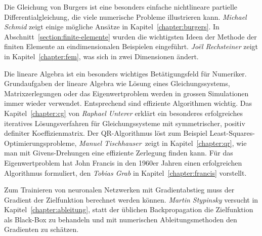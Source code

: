 Die Gleichung von Burgers ist eine besonders einfache nichtlineare
partielle Differentialgleichung, die viele numerische Probleme
illustrieren kann.
%
%
{\em Michael Schmid} zeigt einige mögliche Ansätze in
Kapitel~\ref{chapter:burgers}.
%
In Abschnitt~\ref{section:finite-elemente} wurden die wichtigsten Ideen
der Methode der finiten Elemente an eindimensionalen Beispielen eingeführt.
{\em Joël Rechsteiner} zeigt in Kapitel~\ref{chapter:fem}, was sich in
zwei Dimensionen ändert.
%
%

Die lineare Algebra ist ein besonders wichtiges Betätigungsfeld für
Numeriker.
Grundaufgaben der lineare Algebra wie Lösung eines Gleichungssystems,
Matrixzerlegungen oder das Eigenwertproblem werden in grossen
Simulationen immer wieder verwendet.
%
%
Entsprechend sind effiziente Algorithmen wichtig.
Das Kapitel~\ref{chapter:cg} von {\em Raphael Unterer} erklärt
ein besonderes erfolgreiches iteratives
Lösungsverfahren für Gleichungssysteme mit symmetrischer, positiv
definiter Koeffizienmatrix.
Der QR-Algorithmus löst zum Beispiel Least-Squares-Optimierungsprobleme,
%
{\em Manuel Tischhauser} zeigt in Kapitel~\ref{chapter:qr}, wie man mit
Givens-Drehungen eine effiziente Zerlegung finden kann.
%
%
Für das Eigenwertproblem hat John Francis in den 1960er Jahren einen
erfolgreichen Algorithmus formuliert, den {\em Tobias Grab} in
Kapitel~\ref{chapter:francis} vorstellt.
%
%

Zum Trainieren von neuronalen Netzwerken mit Gradientabstieg muss 
der Gradient der Zielfunktion berechnet werden können.
{\em Martin Stypinsky} versucht in Kapitel~\ref{chapter:ableitung},
statt der üblichen Backpropagation
die Zielfunktion als Black-Box zu behandeln und mit numerischen
Ableitungsmethoden den Gradienten zu schätzen.
%




